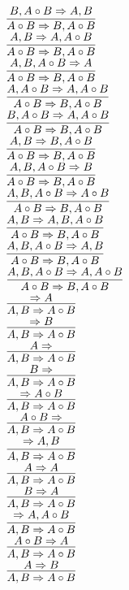 \documentclass[11pt]{article}
\begin{document}
\begin{center}
\bigskip
\\$\infer{A\circ B\Rightarrow B, A\circ B}{B, A\circ B\Rightarrow A, B}$
\bigskip
\\$\infer{A\circ B\Rightarrow B, A\circ B}{A, B\Rightarrow A, A\circ B}$
\bigskip
\\$\infer{A\circ B\Rightarrow B, A\circ B}{A, B, A\circ B\Rightarrow A}$
\bigskip
\\$\infer{A\circ B\Rightarrow B, A\circ B}{A, A\circ B\Rightarrow A, A\circ B}$
\bigskip
\\$\infer{A\circ B\Rightarrow B, A\circ B}{B, A\circ B\Rightarrow A, A\circ B}$
\bigskip
\\$\infer{A\circ B\Rightarrow B, A\circ B}{A, B\Rightarrow B, A\circ B}$
\bigskip
\\$\infer{A\circ B\Rightarrow B, A\circ B}{A, B, A\circ B\Rightarrow B}$
\bigskip
\\$\infer{A\circ B\Rightarrow B, A\circ B}{A, B, A\circ B\Rightarrow A\circ B}$
\bigskip
\\$\infer{A\circ B\Rightarrow B, A\circ B}{A, B\Rightarrow A, B, A\circ B}$
\bigskip
\\$\infer{A\circ B\Rightarrow B, A\circ B}{A, B, A\circ B\Rightarrow A, B}$
\bigskip
\\$\infer{A\circ B\Rightarrow B, A\circ B}{A, B, A\circ B\Rightarrow A, A\circ B}$
\bigskip
\\$\infer{A, B\Rightarrow A\circ B}{\Rightarrow A}$
\bigskip
\\$\infer{A, B\Rightarrow A\circ B}{\Rightarrow B}$
\bigskip
\\$\infer{A, B\Rightarrow A\circ B}{A\Rightarrow }$
\bigskip
\\$\infer{A, B\Rightarrow A\circ B}{B\Rightarrow }$
\bigskip
\\$\infer{A, B\Rightarrow A\circ B}{\Rightarrow A\circ B}$
\bigskip
\\$\infer{A, B\Rightarrow A\circ B}{A\circ B\Rightarrow }$
\bigskip
\\$\infer{A, B\Rightarrow A\circ B}{\Rightarrow A, B}$
\bigskip
\\$\infer{A, B\Rightarrow A\circ B}{A\Rightarrow A}$
\bigskip
\\$\infer{A, B\Rightarrow A\circ B}{B\Rightarrow A}$
\bigskip
\\$\infer{A, B\Rightarrow A\circ B}{\Rightarrow A, A\circ B}$
\bigskip
\\$\infer{A, B\Rightarrow A\circ B}{A\circ B\Rightarrow A}$
\bigskip
\\$\infer{A, B\Rightarrow A\circ B}{A\Rightarrow B}$

\end{center}
\end{document}
